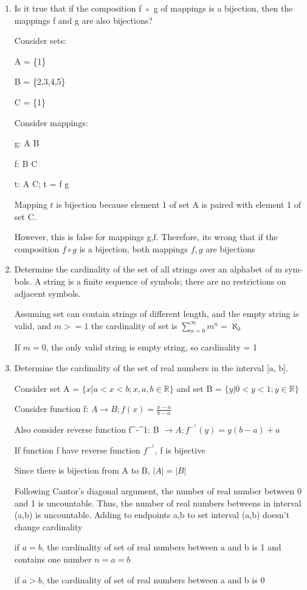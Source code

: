 \documentclass[12pt]{article}
\begin{document}
\begin{enumerate}
Mapping $g$ is surjective $\iff \forall z \in C, \exists x \in A | g(x) = z$

$g(x) = z = f(y) = f(t(x)) \rightarrow \forall z \in C, \exists x \in A | g(x) = z$ 

Therefore, composition of surjections is surjective


\item  Is it true that if the composition f ◦ g of mappings is a bijection, then the mappings f and g are also bijections?

Consider sets:

A = \{1\}

B = \{2,3,4,5\}

C = \{1\}

Consider mappings:

g: A \rightarrow B

f: B \rightarrow C

t: A \rightarrow C; t = f \circ g

Mapping $t$ is bijection because element 1 of set A is paired with element 1 of set C.

However, this is false for mappings g,f. Therefore, its wrong that if the composition $f \circ g$ is a bijection, both mappings $f,g$ are bijections


\item Determine the cardinality of the set of all strings over an alphabet of m sym-
bols. A string is a finite sequence of symbols; there are no restrictions on adjacent symbols.

Assuming set can contain strings of different length, and the empty string is valid, and $m >= 1$ the cardinality of set is $\sum_{n=0}^{\infty} m^n = \aleph_0$

If $m = 0$, the only valid string is empty string, so cardinality = 1

\item Determine the cardinality of the set of real numbers in the interval [a, b].


Consider set A = $\{x | a < x < b; x,a,b \in \mathbb{R}\}$ and set B = $\{y | 0 < y < 1; y \in \mathbb{R}\}$

Consider function f: $A \rightarrow B; f(x) = \frac{x-a}{b-a}$

Also consider reverse function f^-^1: B $\rightarrow A; f^-^1(y) =  y(b-a) +a$

If function f have reverse function $f^-^1$, f is bijective

Since there is bijection from A to B, $|A| = |B|$

Following Cantor's diagonal argument, the number of real number between 0 and 1 is uncountable. Thus, the number of real numbers betweens in interval (a,b) is uncountable. Adding to endpoints a,b to set interval (a,b) doesn't change cardinality

if $a = b$, the cardinality of set of real numbers between a and b is 1 and contains one number $n = a = b$

if $a > b$, the cardinality of set of real numbers between a and b is 0

\end{enumerate}
\end{document}
